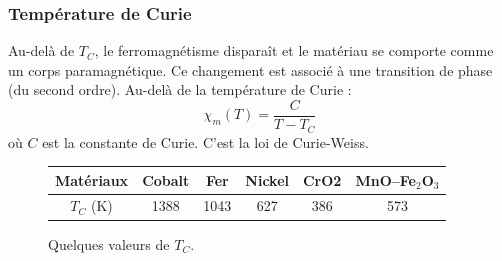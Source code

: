 \documentclass[11pt,a4paper]{report}
\begin{document}
\subsubsection{Température de Curie}	

Au-delà de $T_C$, le ferromagnétisme disparaît et le matériau se comporte comme un corps paramagnétique. Ce changement est associé à une transition de phase (du second ordre). Au-delà de la température de Curie :
\begin{equation}
	\boxed{\chi_m (T) = \frac{C}{T-T_C}}
\end{equation}
où $C$ est la constante de Curie. C'est la loi de Curie-Weiss.\\
		
\begin{figure}[h!]
	\begin{center}
	\begin{tabular}{|c|c|c|c|c|c|}
  	\hline
  	Matériaux & Cobalt & Fer  & Nickel & CrO2 & MnO–Fe$_2$O$_3$\\
 	\hline
  	$T_C$ (K) & 1388   & 1043 & 627    & 386  & 573 \\
  	\hline
	\end{tabular}
	\end{center}
	\caption{Quelques valeurs de $T_C$.}
\end{figure}
	
\end{document}
